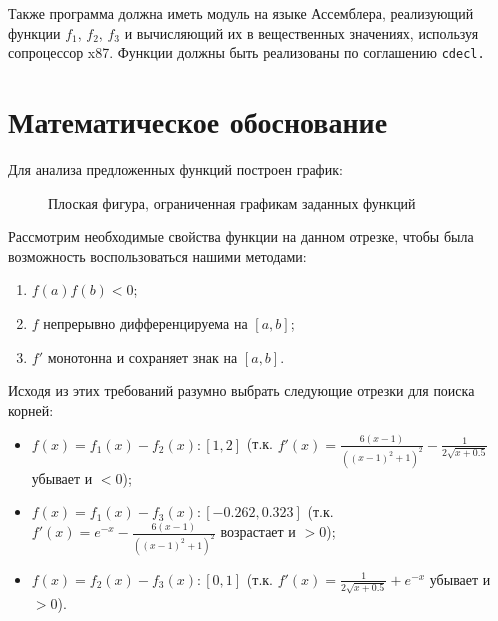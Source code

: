 \documentclass[a4paper,12pt,titlepage,finall]{article}
\begin{document}
Также программа должна иметь модуль на языке Ассемблера, реализующий функции $f_1$, $f_2$, $f_3$ и вычисляющий их в вещественных значениях, используя сопроцессор x87. Функции должны быть реализованы по соглашению \tt{cdecl}.

\newpage

\section{Математическое обоснование}

Для анализа предложенных функций построен график:

\begin{figure}[h]
\centering
{}
\caption{Плоская фигура, ограниченная графикам заданных функций}
\label{plot1}
\end{figure}
Рассмотрим необходимые свойства функции на данном отрезке, чтобы была возможность воспользоваться нашими методами:
\begin{enumerate}
    \item $f(a)f(b) < 0$;
    \item $f$ непрерывно дифференцируема на $[a,b]$;
    \item $f'$ монотонна и сохраняет знак на $[a,b]$.
\end{enumerate}

Исходя из этих требований разумно выбрать следующие отрезки для поиска корней:
\begin{itemize}
\item $f(x) = f_1(x) - f_2(x): [1, 2]$ (т.к. $f'(x) = \frac{6(x-1)}{((x-1)^2+1)^2} - \frac{1}{2\sqrt{x + 0.5}}$ убывает и $<0$);
\item $f(x) = f_1(x) - f_3(x): [-0.262, 0.323]$ (т.к. $f'(x) = e^{-x} - \frac{6(x-1)}{((x-1)^2+1)^2}$ возрастает и $>0$);
\item $f(x) = f_2(x) - f_3(x): [0, 1]$ (т.к. $f'(x) = \frac{1}{2\sqrt{x + 0.5}} + e^{-x}$ убывает и $>0$).
\end{itemize}
\end{document}
